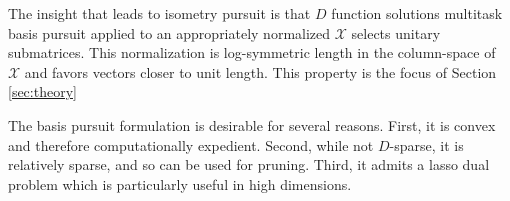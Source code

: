 \documentclass[a4paper,11pt]{article}
\begin{document}

The insight that leads to isometry pursuit is that $D$ function solutions multitask basis pursuit applied to an appropriately normalized $\mathcal X$ selects unitary submatrices.
This normalization is log-symmetric length in the column-space of $\mathcal X$ and favors vectors closer to unit length.
This property is the focus of Section \ref{sec:theory}

The basis pursuit formulation is desirable for several reasons.
First, it is convex and therefore computationally expedient.
Second, while not $D$-sparse, it is relatively sparse, and so can be used for pruning. %
Third, it admits a lasso dual problem which is particularly useful in high dimensions.








\end{document}
